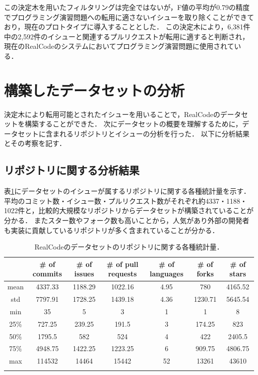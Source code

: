 この決定木を用いたフィルタリングは完全ではないが，F値の平均が0.79の精度でプログラミング演習問題への転用に適さないイシューを取り除くことができており，現在のプロトタイプに導入することとした．
この決定木により，6,381件中の2,592件のイシューと関連するプルリクエストが転用に適すると判断され，現在のRealCodeのシステムにおいてプログラミング演習問題に使用されている．



\section{構築したデータセットの分析}
決定木により転用可能とされたイシューを用いることで，RealCodeのデータセットを構築することができた．
次にデータセットの概要を理解するために，データセットに含まれるリポジトリとイシューの分析を行った．
以下に分析結果とその考察を記す．

\subsection{リポジトリに関する分析結果}

表\ref{table:stats_repos}にデータセットのイシューが属するリポジトリに関する各種統計量を示す．
平均のコミット数・イシュー数・プルリクエスト数がそれぞれ約4337・1188・1022件と，比較的大規模なリポジトリからデータセットが構築されていることが分かる．
またスター数やフォーク数も高いことから，人気があり外部の開発者も実装に貢献しているリポジトリが多く含まれていることが分かる．

\begin{table}[!b]
  \small
  \centering
  \caption{RealCodeのデータセットのリポジトリに関する各種統計量．}
  \label{table:stats_repos}
  \begin{tabular}{c || c | c | c | c | c | c} \Xhline{3\arrayrulewidth}
        & \# of commits & \# of issues & \# of pull requests & \# of languages & \# of forks & \# of stars \\ \hline
        mean & 4337.33 & 1188.29 & 1022.16 & 4.95 & 780 & 4165.52 \\
        std & 7797.91 & 1728.25 & 1439.18 & 4.36 & 1230.71 & 5645.54 \\
        min & 35 & 5 & 3 & 1 & 1 & 8 \\
        25\% & 727.25 & 239.25 & 191.5 & 3 & 174.25 & 823 \\
        50\% & 1795.5 & 582 & 524 & 4 & 422 & 2405.5 \\
        75\% & 4948.75 & 1422.25 & 1223.25 & 6 & 909.75 & 4806.75 \\
        max & 114532 & 14464 & 15442 & 52 & 13261 & 43610 \\
    \Xhline{3\arrayrulewidth}
\end{tabular}
\end{table}

